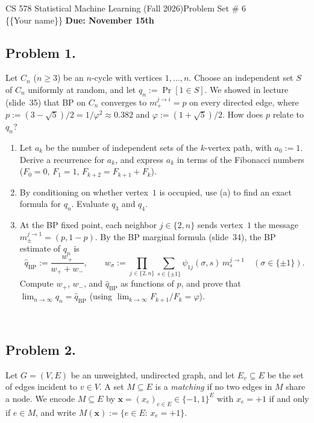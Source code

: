 \documentclass[12pt]{article}
\theoremstyle{plain}
\theoremstyle{definition}
\begin{document}
\noindent CS 578 Statistical Machine Learning (Fall 2026)\hfill Problem Set \# 6\\
\{\{Your name\}\} \hfill \textbf{Due: November 15th}

\noindent\hrulefill

\subsection*{Problem 1.}

Let $C_n$ ($n\ge3$) be an $n$-cycle with vertices $1,\dots,n$. Choose an independent set $S$ of $C_n$ uniformly at random, and let $q_n:=\Pr[1\in S]$. We showed in lecture (slide~35) that BP on $C_n$ converges to $m^{j\to i}_+=p$ on every directed edge, where $p:=(3-\sqrt5)/2=1/\varphi^2\approx0.382$ and $\varphi:=(1+\sqrt5)/2$. How does $p$ relate to $q_n$?

\begin{enumerate}[label=(\alph*),itemsep=0.3em]
\item Let $a_k$ be the number of independent sets of the $k$-vertex path, with $a_0:=1$. Derive a recurrence for $a_k$, and express $a_k$ in terms of the Fibonacci numbers ($F_0=0$, $F_1=1$, $F_{k+2}=F_{k+1}+F_k$).

\item By conditioning on whether vertex~$1$ is occupied, use (a) to find an exact formula for $q_n$. Evaluate $q_3$ and $q_4$.

\item At the BP fixed point, each neighbor $j\in\{2,n\}$ sends vertex~$1$ the message $m^{j\to1}_\pm=(p, 1-p)$. By the BP marginal formula (slide~34), the BP estimate of $q_n$ is
\[
\widehat q_{\mathrm{BP}}:=\frac{w_+}{w_++w_-},\qquad
w_\sigma:=\prod_{j\in\{2,n\}} \sum_{s\in\{\pm1\}}\psi_{1j}(\sigma,s)\,m^{j\to1}_s\quad(\sigma\in\{\pm1\}).
\]
Compute $w_+$, $w_-$, and $\widehat q_{\mathrm{BP}}$ as functions of $p$, and prove that $\lim_{n\to\infty}q_n=\widehat q_{\mathrm{BP}}$ (using $\lim_{k\to\infty}F_{k+1}/F_k=\varphi$).
\end{enumerate}
\newline 
\   %
\newpage


\subsection*{Problem 2.}

Let $G=(V,E)$ be an unweighted, undirected graph, and let $E_v\subseteq E$ be the set of edges incident to $v\in V$. A set $M\subseteq E$ is a \emph{matching} if no two edges in $M$ share a node. We encode $M\subseteq E$ by $\mathbf{x}=(x_e)_{e\in E}\in\{-1,1\}^{E}$ with $x_e=+1$ if and only if $e\in M$, and write $M(\mathbf{x}):=\{e\in E:\, x_e=+1\}$.
\end{document}
